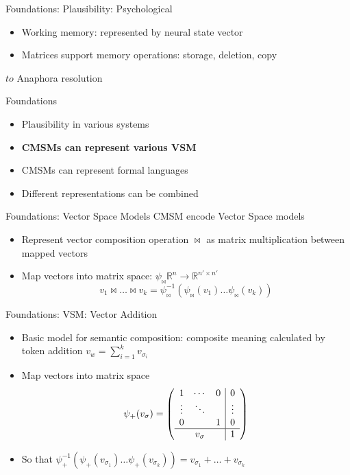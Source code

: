 \documentclass[12pt,a4paper]{beamer}
\begin{document}
\begin{frame}{Foundations: Plausibility: Psychological}
\begin{itemize}
\item Working memory: represented by neural state vector %
\item Matrices support memory operations: storage, deletion, copy
\end{itemize}
$to$ Anaphora resolution
\end{frame}

\begin{frame}{Foundations}
\begin{itemize}
\item Plausibility in various systems
\item \textbf{CMSMs can represent various VSM}
\item CMSMs can represent formal languages
\item Different representations can be combined
\end{itemize}
\end{frame}


\begin{frame}{Foundations: Vector Space Models}
CMSM encode Vector Space models
\begin{itemize}
\item Represent vector composition operation $\bowtie$ as matrix multiplication between mapped vectors
\item Map vectors into matrix space: $\psi_{\bowtie} \mathbb{R}^{n} \to \mathbb{R}^{n'\times n'} $
$$ v_{1} \bowtie \ldots \bowtie v_{k} = \psi_{\bowtie}^{-1}(\psi_{\bowtie}(v_{1}) \ldots \psi_{\bowtie}(v_{k}) )$$
\end{itemize}
\end{frame}


\begin{frame}{Foundations: VSM: Vector Addition}
\begin{itemize}
\item Basic model for semantic composition: composite meaning calculated by token addition $v_{w} = \sum_{i=1}^{k}v_{\sigma_{i}}$
\item Map vectors into matrix space
$$  \psi_{+}(v_{\sigma}) =
\left( \begin{array}{ccc|c}
1 & \cdots & 0 & 0 \\
\vdots & \ddots & & \vdots \\
0 &  & 1 & 0 \\ \hline
&  v_{\sigma} & & 1 \end{array} \right) $$
\item So that $\psi_{+}^{-1} (\psi_{+}(v_{\sigma_{1}}) \ldots \psi_{+}(v_{\sigma_{k}})) = v_{\sigma_{1}} + \ldots + v_{\sigma_{k}}$
\end{itemize}
\end{frame}
\end{document}
